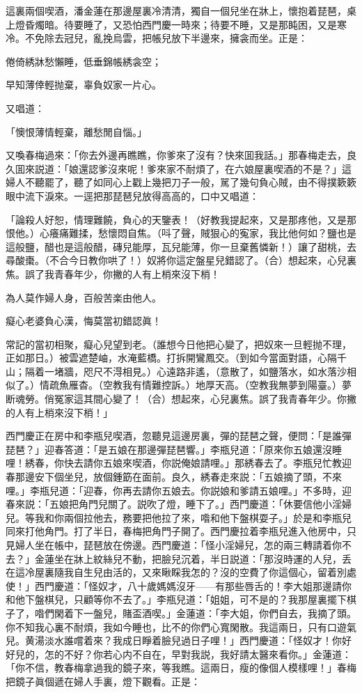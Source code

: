 這裏兩個喫酒，潘金蓮在那邊屋裏冷清清，獨自一個兒坐在牀上，懷抱着琵琶，桌上燈昏燭暗。待要睡了，又恐怕西門慶一時來；待要不睡，又是那盹困，又是寒冷。不免除去冠兒，亂挽烏雲，把帳兒放下半邊來，擁衾而坐。正是：

倦倚綉牀愁懶睡，低垂錦帳綉衾空；

早知薄倖輕抛棄，辜負奴家一片心。

又唱道：

「懊恨薄情輕棄，離愁閒自惱。」

又喚春梅過來：「你去外邊再瞧瞧，你爹來了沒有？快來囬我話。」那春梅走去，良久囬來説道：「娘還認爹沒來呢！爹來家不耐煩了，在六娘屋裏喫酒的不是？」這婦人不聽罷了，聽了如同心上戳上幾把刀子一般，駡了幾句負心賊，由不得撲簌簌眼中流下淚來。一逕把那琵琶兒放得高高的，口中又唱道：

「論殺人好恕，情理難饒，負心的天鑒表！（好教我提起來，又是那疼他，又是那恨他。）心癢痛難揉，愁懷悶自焦。（呌了聲，賊狠心的寃家，我比他何如？鹽也是這般鹽，醋也是這般醋，磚兒能厚，瓦兒能薄，你一旦棄舊憐新！）讓了甜桃，去尋酸棗。（不合今日教你哄了！）奴將你這定盤星兒錯認了。（合）想起來，心兒裏焦。誤了我青春年少，你撇的人有上梢來沒下梢！　

為人莫作婦人身，百般苦楽由他人。

癡心老婆負心漢，悔莫當初錯認眞！

常記的當初相聚，癡心兒望到老。（誰想今日他把心變了，把奴來一旦輕抛不理，正如那日。）被雲遮楚岫，水淹藍橋。打拆開鸞鳳交。（到如今當面對語，心隔千山；隔着一堵牆，咫尺不淂相見。）心遠路非遙，（意散了，如鹽落水，如水落沙相似了。）情疏魚雁杳。（空教我有情難控訴。）地厚天高。（空教我無夢到陽臺。）夢断魂勞。俏冤家這其間心變了！（合）想起來，心兒裏焦。誤了我青春年少。你撇的人有上梢來沒下梢！」

西門慶正在房中和李瓶兒喫酒，忽聽見這邊房裏，彈的琵琶之聲，便問：「是誰彈琵琶？」迎春答道：「是五娘在那邊彈琵琶響。」李瓶兒道：「原來你五娘還沒睡哩！綉春，你快去請你五娘來喫酒，你説俺娘請哩。」那綉春去了。李瓶兒忙教迎春那邊安下個坐兒，放個鍾筯在面前。良久，綉春走來説：「五娘摘了頭，不來哩。」李瓶兒道：「迎春，你再去請你五娘去。你説娘和爹請五娘哩。」不多時，迎春來説：「五娘把角門兒關了。説吹了燈，睡下了。」西門慶道：「休要信他小淫婦兒。等我和你兩個拉他去，務要把他拉了來，喒和他下盤棋耍子。」於是和李瓶兒同來打他角門。打了半日，春梅把角門子開了。西門慶拉着李瓶兒進入他房中，只見婦人坐在帳中，琵琶放在傍邊。西門慶道：「怪小淫婦兒，怎的兩三轉請着你不去？」金蓮坐在牀上紋絲兒不動，把臉兒沉着，半日説道：「那沒時運的人兒，丢在這冷屋裏隨我自生兒由活的，又來瞅睬我怎的？沒的空費了你這個心，留着別處使！」西門慶道：「怪奴才，八十歲媽媽沒牙——有那些唇舌的！李大姐那邊請你和他下盤棋兒，只顧等你不去了。」李瓶兒道：「姐姐，可不是的？我那屋裏擺下棋子了，喒們閑着下一盤兒，賭盃酒喫。」金蓮道：「李大姐，你們自去，我摘了頭。你不知我心裏不耐煩，我如今睡也，比不的你們心寬閑散。我這兩日，只有口遊氣兒。黄湯淡水誰嚐着來？我成日睜着臉兒過日子哩！」西門慶道：「怪奴才！你好好兒的，怎的不好？你若心内不自在，早對我説，我好請太醫來看你。」金蓮道：「你不信，教春梅拿過我的鏡子來，等我瞧。這兩日，瘦的像個人模樣哩！」春梅把鏡子眞個遞在婦人手裏，燈下觀看。正是：


